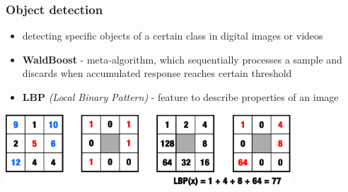 \documentclass{beamer}
\begin{document}
		\begin{frame}[t,fragile]
		\frametitle{Object detection}
		
		\begin{itemize}
			\item detecting specific objects of a certain class in digital images or videos
			\item \textbf{WaldBoost} - meta-algorithm, which sequentially processes a sample and discards when accumulated response reaches certain threshold
			\item \textbf{LBP} \textit{(Local Binary Pattern)} - feature to describe properties of an image
		\end{itemize}		
		
		\vspace{6mm}		
		
		\centering\includegraphics[width=0.8\textwidth]{img/lbp.eps}
		
	\end{frame}

\end{document}
